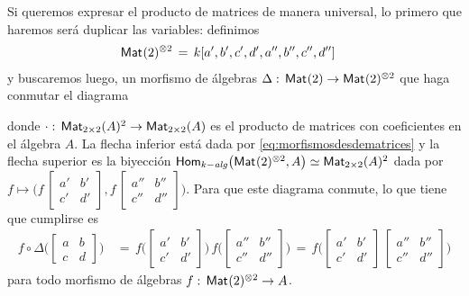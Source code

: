 Si queremos expresar el producto de matrices de manera universal, lo primero
que haremos ser\'{a} duplicar las variables: definimos
\begin{align*}
	\MM(2)^{\otimes 2} & \,=\,k[a',b',c',d',a'',b'',c'',d'']
\end{align*}
%
y buscaremos luego, un morfismo de \'{a}lgebras
$\Delta:\,\MM(2)\rightarrow\MM(2)^{\otimes 2}$ que haga conmutar el diagrama
\begin{center}
\end{center}
donde $\cdot:\,\MM[2\times 2](A)^2\rightarrow\MM[2\times 2](A)$ es el producto
de matrices con coeficientes en el \'{a}lgebra $A$. La flecha inferior est\'{a}
dada por \eqref{eq:morfismosdesdematrices} y la flecha superior es la
biyecci\'{o}n
\begin{math}
	\Homalg\big(\MM(2)^{\otimes 2},A\big)\simeq\MM[2\times 2](A)^2
\end{math} dada por
\begin{math}
	f\mapsto\big(f\,
		\left[\begin{smallmatrix}
			a' & b' \\ c' & d'
		\end{smallmatrix}\right],
		f\,
		\left[\begin{smallmatrix}
			a'' & b'' \\ c'' & d''
		\end{smallmatrix}\right]\big)
\end{math}. Para que este diagrama conmute, lo que tiene que cumplirse es
\begin{align*}
	f\circ\Delta\Big(\begin{bmatrix} a & b \\ c & d \end{bmatrix}\Big)
		& \,=\,
		f\Big(\begin{bmatrix} a' & b' \\ c' & d' \end{bmatrix}\Big)\,
		f\Big(\begin{bmatrix} a'' & b'' \\ c'' & d'' \end{bmatrix}\Big)
			\,=\,
		f\Big(\begin{bmatrix} a' & b' \\ c' & d' \end{bmatrix}\,
			\begin{bmatrix}
				a'' & b'' \\ c'' & d''
			\end{bmatrix}\Big)
\end{align*}
%
para todo morfismo de \'{a}lgebras $f:\,\MM(2)^{\otimes 2}\rightarrow A$.

